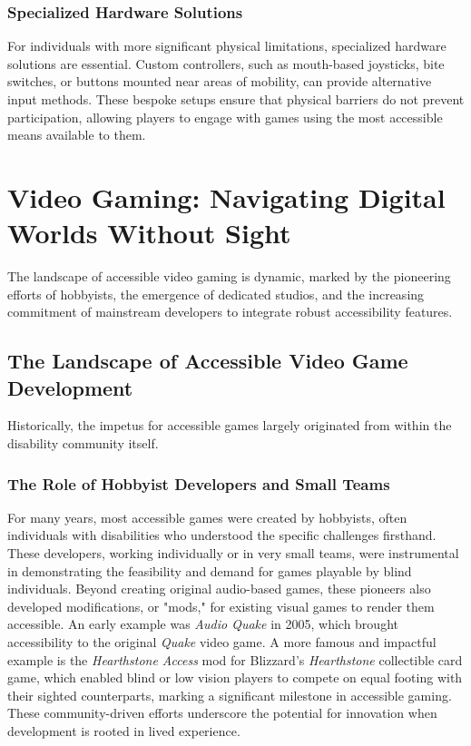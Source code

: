 \subsubsection{Specialized Hardware Solutions}

For individuals with more significant physical limitations, specialized hardware solutions are essential. Custom controllers, such as mouth-based joysticks, bite switches, or buttons mounted near areas of mobility, can provide alternative input methods\supercite{LighthouseGuild2025}. These bespoke setups ensure that physical barriers do not prevent participation, allowing players to engage with games using the most accessible means available to them.

\section{Video Gaming: Navigating Digital Worlds Without Sight}

The landscape of accessible video gaming is dynamic, marked by the pioneering efforts of hobbyists, the emergence of dedicated studios, and the increasing commitment of mainstream developers to integrate robust accessibility features.

\subsection{The Landscape of Accessible Video Game Development}

Historically, the impetus for accessible games largely originated from within the disability community itself.

\subsubsection{The Role of Hobbyist Developers and Small Teams}

For many years, most accessible games were created by hobbyists, often individuals with disabilities who understood the specific challenges firsthand. These developers, working individually or in very small teams, were instrumental in demonstrating the feasibility and demand for games playable by blind individuals\supercite{AFBIntroVG}. Beyond creating original audio-based games, these pioneers also developed modifications, or "mods," for existing visual games to render them accessible. An early example was \textit{Audio Quake} in 2005, which brought accessibility to the original \textit{Quake} video game. A more famous and impactful example is the \textit{Hearthstone Access} mod for Blizzard's \textit{Hearthstone} collectible card game, which enabled blind or low vision players to compete on equal footing with their sighted counterparts, marking a significant milestone in accessible gaming\supercite{AFBIntroVG}. These community-driven efforts underscore the potential for innovation when development is rooted in lived experience.

